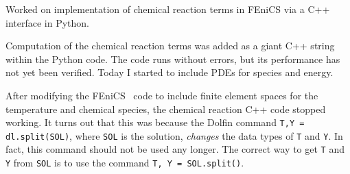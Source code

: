 \documentclass[fontsize=11pt, %
               paper=a4, %
               oneside, %
               captions=tableheading,
               index=totoc,
               hyperref]{labbook}
\newcommand{\fenics}{FEniCS \ }
\begin{document}

\title{}

\author{
    \\ \\ %
}
\date{} %

\maketitle %

\printindex
\tableofcontents %
\newpage %


\pagestyle{scrheadings} %



Worked on implementation of chemical reaction terms in FEniCS via a C++ interface in Python.


Computation of the chemical reaction terms was added as a giant C++ string within the Python code.  The code runs without errors, but its performance has not yet been verified.  Today I started to include PDEs for species and energy.


After modifying the \fenics code to include finite element spaces for the temperature and chemical species, the chemical reaction C++ code stopped working.  It turns out that this was because the Dolfin command \texttt{T,Y = dl.split(SOL)},  where \texttt{SOL} is the solution, \textit{changes} the data types of \texttt{T} and \texttt{Y}.  In fact, this command should not be used any longer.  The correct way to get \texttt{T} and \texttt{Y} from \texttt{SOL} is to use the command \texttt{T, Y = SOL.split()}.
\end{document}
